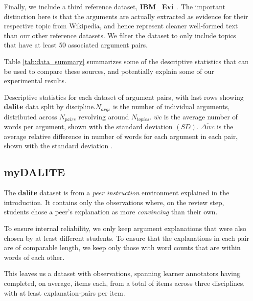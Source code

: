 \documentclass[runningheads]{llncs}
\begin{document}
Finally, we include a third reference dataset, 
\textbf{IBM\_Evi}~\cite{gleize_are_2019}. 
The important distinction here is that the arguments are actually extracted as 
evidence for their respective topic from Wikipedia, and hence represent cleaner 
well-formed text than our other reference datasets. We filter the dataset to 
only include topics that have at least 50 associated argument pairs.

Table \ref{tab:data_summary} summarizes some of the descriptive statistics that 
can be used to compare these sources, and potentially explain some of our 
experimental results. 

\begin{table}
	\caption{Descriptive statistics for each dataset of argument pairs, with 
		last rows showing \textbf{dalite} data split by discipline.$N_{args}$ 
		is the number of individual arguments, distributed across $N_{pairs}$ 
		revolving around $N_{topics}$. $\overline{wc}$ is the average number of 
		words per argument, shown with the standard deviation $(SD)$. 
		$\overline{\Delta wc}$ is the average relative difference in number of 
		words for each argument in each pair, shown with the standard deviation 
		.}
	\centerline{}
	\label{tab:data_summary}
\end{table}

\subsection{myDALITE}
The \textbf{dalite} dataset is from a \textit{peer instruction} environment 
explained in the introduction.
It contains only the observations where, on the review step, students chose a 
peer's explanation as more \textit{convincing} than their own.  

To ensure internal reliability, we only keep argument explanations that were 
also chosen by at least different 
students. 
To ensure that the explanations in each pair are of comparable length, we keep 
only those with word counts that are within 
words of each other. 

This leaves us a dataset with observations, 
spanning  learner annotators having 
completed, on average, 
 items each, from a total of 
 items across three disciplines, 
with at least 
explanation-pairs 
per item.
\end{document}
